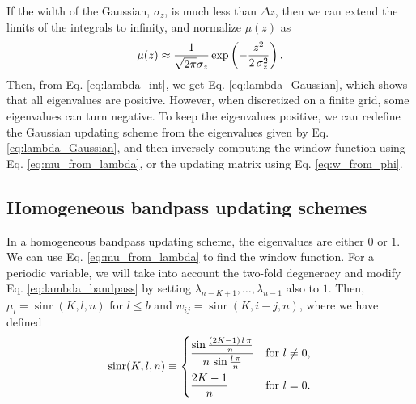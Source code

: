 \documentclass[preprint, superscriptaddress, floatfix]{revtex4-1}
\begin{document}
If the width of the Gaussian, $\sigma_z$,
is much less than $\Delta z$,
then we can extend the limits of the integrals
to infinity, and normalize $\mu(z)$ as
%
\begin{equation}
  \mu(z)
  \approx
  \frac{            1            }
       { \sqrt{ 2 \pi } \sigma_z }
  \exp\left(
        -\frac{   z^2   }
              { 2 \, \sigma_z^2 }
      \right)
  .
\notag
\end{equation}
%
Then, from Eq. \eqref{eq:lambda_int},
we get Eq. \eqref{eq:lambda_Gaussian},
which shows that all eigenvalues are positive.
%
However,
when discretized on a finite grid,
some eigenvalues can turn negative.
%
To keep the eigenvalues positive,
we can redefine the Gaussian updating scheme
from the eigenvalues given by Eq. \eqref{eq:lambda_Gaussian},
and then inversely computing the window function
using Eq. \eqref{eq:mu_from_lambda},
or the updating matrix using Eq. \eqref{eq:w_from_phi}.




\subsection{\label{sec:homo_bandpass}
Homogeneous bandpass updating schemes}



In a homogeneous bandpass updating scheme,
the eigenvalues are either $0$ or $1$.
%
We can use Eq. \eqref{eq:mu_from_lambda}
to find the window function.
%
For a periodic variable,
we will take into account the two-fold degeneracy
and modify Eq. \eqref{eq:lambda_bandpass}
by setting $\lambda_{n-K+1}, \dots, \lambda_{n-1}$
also to $1$.
%
Then, $\mu_l = \operatorname{sinr}(K, l, n)$ for $l \le b$
and $w_{ij} = \operatorname{sinr}(K, i-j, n)$,
where we have defined
\begin{equation}
  \operatorname{sinr}(K, l, n)
  \equiv
  \begin{dcases}
    \frac{
      \sin
      \frac{ (2 K - 1) \, l \, \pi }
           {              n        }
    }
    {
      n \, \sin \frac{ l \, \pi } { n }
    }
    & \text{for $l \ne 0$}, \\
    \frac{2K-1}{n}
    & \text{for $l = 0$}.
  \end{dcases}
\notag
\end{equation}
%
\end{document}
